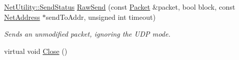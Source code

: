 \begin{DoxyCompactItemize}
\hyperlink{class_net_utility_a8051eca61204ffd818281419bbf44736}{NetUtility::SendStatus} \hyperlink{class_net_socket_u_d_p_ad05b84f0d746d2f8cdd33b36109f541b}{RawSend} (const \hyperlink{class_packet}{Packet} \&packet, bool block, const \hyperlink{class_net_address}{NetAddress} $\ast$sendToAddr, unsigned int timeout)
\begin{DoxyCompactList}\small\item\em Sends an unmodified packet, ignoring the UDP mode. \item\end{DoxyCompactList}\item 
\hypertarget{class_net_socket_u_d_p_a2363fe21c1fa15e7781766c952c72e95}{
virtual void \hyperlink{class_net_socket_u_d_p_a2363fe21c1fa15e7781766c952c72e95}{Close} ()}
\label{class_net_socket_u_d_p_a2363fe21c1fa15e7781766c952c72e95}


\end{DoxyCompactItemize}
